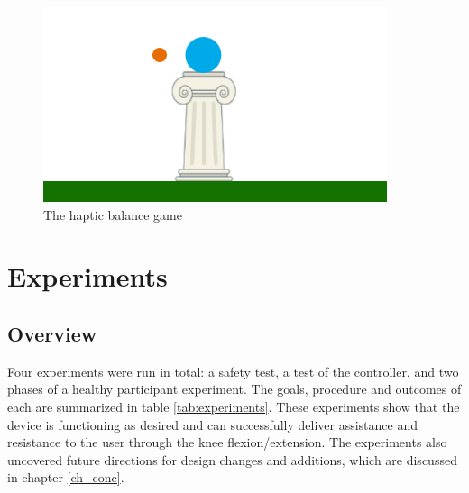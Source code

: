 \documentclass[12pt]{report}
\begin{document}
\begin{figure}[h] 
		\centering
		\includegraphics[width=0.75\linewidth]{balance_game}
		\caption{The haptic balance game}
		\label{fig:balance_game}
	\end{figure} 
			

	
\chapter{Experiments}

	\section{Overview}
	
	Four experiments were run in total: a safety test, a test of the controller, and two phases of a healthy participant experiment. The goals, procedure and outcomes of each are summarized in table \ref{tab:experiments}. These experiments show that the device is functioning as desired and can successfully deliver assistance and resistance to the user through the knee flexion/extension. The experiments also uncovered future directions for design changes and additions, which are discussed in chapter \ref{ch_conc}. 
	
\end{document}
